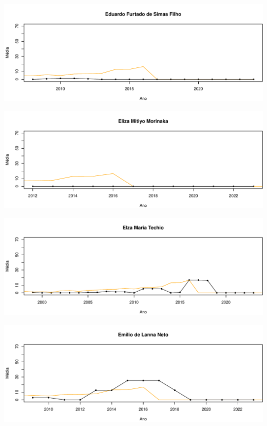 \documentclass[12pt,brazil]{article}\usepackage[]{graphicx}\usepackage[]{xcolor}
\makeatletter
\def\maxwidth{ %
  \ifdim\Gin@nat@width>\linewidth
    \linewidth
  \else
    \Gin@nat@width
  \fi
}
\makeatother
\begin{document}
\vspace{0.5cm}


{\centering \includegraphics[width=\maxwidth]{figure/mediamovel-19} 

}



\vspace{0.5cm}


{\centering \includegraphics[width=\maxwidth]{figure/mediamovel-20} 

}



\vspace{0.5cm}


{\centering \includegraphics[width=\maxwidth]{figure/mediamovel-21} 

}



\vspace{0.5cm}


{\centering \includegraphics[width=\maxwidth]{figure/mediamovel-22} 

}
\end{document}
